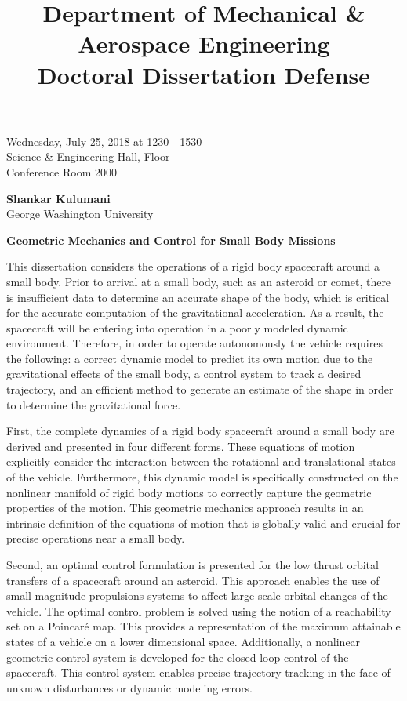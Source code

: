 \documentclass{article}
\title{Department of Mechanical \& Aerospace Engineering\\
Doctoral Dissertation Defense}
\date{}
\newcommand{\Poincare}{Poincar\'e }
\begin{document}
\maketitle

\begin{center}
    Wednesday, July 25, 2018 at 1230 - 1530\\
    Science \& Engineering Hall,  Floor\\
    Conference Room 2000
\end{center}

\begin{center}
    \textbf{Shankar Kulumani}\\
    George Washington University
\end{center}

\begin{center}
    \textbf{Geometric Mechanics and Control for Small Body Missions}
\end{center}

This dissertation considers the operations of a rigid body spacecraft around a small body.
Prior to arrival at a small body, such as an asteroid or comet, there is insufficient data to determine an accurate shape of the body, which is critical for the accurate computation of the gravitational acceleration. 
As a result, the spacecraft will be entering into operation in a poorly modeled dynamic environment.
Therefore, in order to operate autonomously the vehicle requires the following: a correct dynamic model to predict its own motion due to the gravitational effects of the small body, a control system to track a desired trajectory, and an efficient method to generate an estimate of the shape in order to determine the gravitational force.

First, the complete dynamics of a rigid body spacecraft around a small body are derived and presented in four different forms.
These equations of motion explicitly consider the interaction between the rotational and translational states of the vehicle.
Furthermore, this dynamic model is specifically constructed on the nonlinear manifold of rigid body motions to correctly capture the geometric properties of the motion. 
This geometric mechanics approach results in an intrinsic definition of the equations of motion that is globally valid and crucial for precise operations near a small body.

Second, an optimal control formulation is presented for the low thrust orbital transfers of a spacecraft around an asteroid. 
This approach enables the use of small magnitude propulsions systems to affect large scale orbital changes of the vehicle. 
The optimal control problem is solved using the notion of a reachability set on a \Poincare map.
This provides a representation of the maximum attainable states of a vehicle on a lower dimensional space.
Additionally, a nonlinear geometric control system is developed for the closed loop control of the spacecraft.
This control system enables precise trajectory tracking in the face of unknown disturbances or dynamic modeling errors. 
\end{document}
